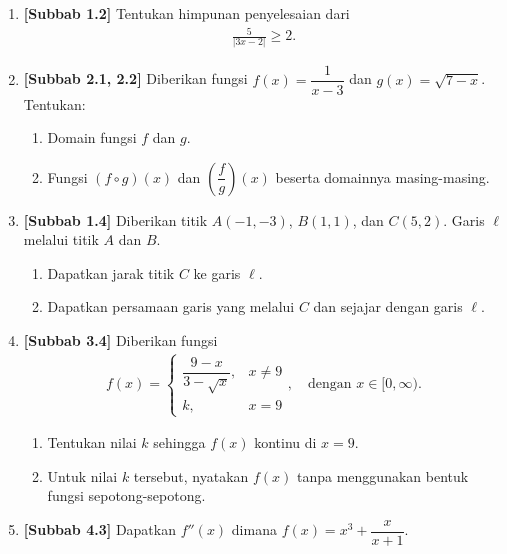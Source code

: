 \documentclass[10pt,openany,a4paper]{article}
\theoremstyle{definition}
\theoremstyle{definition}
\theoremstyle{plain}
\begin{document}
\begin{enumerate}
    \item \textbf{[Subbab 1.2]} Tentukan himpunan penyelesaian dari
    \begin{align*}
        \frac{5}{|3x-2|}\geq 2.
    \end{align*}

    \item \textbf{[Subbab 2.1, 2.2]} Diberikan fungsi $f(x)=\dfrac{1}{x-3}$ dan $g(x)=\sqrt{7-x}$. Tentukan:
    \begin{enumerate}
        \item Domain fungsi $f$ dan $g$.
        \item Fungsi $(f\circ g)(x)$ dan $\left(\dfrac{f}{g}\right)(x)$ beserta domainnya masing-masing.
    \end{enumerate}

    \item \textbf{[Subbab 1.4]} Diberikan titik $A(-1,-3)$, $B(1,1)$, dan $C(5,2)$. Garis $\ell$ melalui titik $A$ dan $B$.
    \begin{enumerate}
        \item Dapatkan jarak titik $C$ ke garis $\ell$.
        \item Dapatkan persamaan garis yang melalui $C$ dan sejajar dengan garis $\ell$.
    \end{enumerate}

    \item \textbf{[Subbab 3.4]} Diberikan fungsi
    \begin{align*}
        f(x)=\begin{cases}
            \dfrac{9-x}{3-\sqrt{x}}, & x\neq 9\\
            k, & x=9
        \end{cases},\quad \text{dengan } x\in[0,\infty).
    \end{align*}
    \begin{enumerate}
        \item Tentukan nilai $k$ sehingga $f(x)$ kontinu di $x=9$.
        \item Untuk nilai $k$ tersebut, nyatakan $f(x)$ tanpa menggunakan bentuk fungsi sepotong-sepotong.
    \end{enumerate}

    \item \textbf{[Subbab 4.3]} Dapatkan $f''(x)$ dimana $f(x)=x^3+\dfrac{x}{x+1}$.
\end{enumerate}
\end{document}
